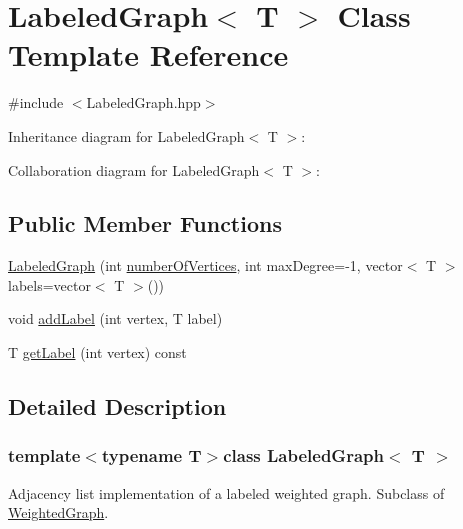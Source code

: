 \hypertarget{class_labeled_graph}{\section{Labeled\-Graph$<$ T $>$ Class Template Reference}
\label{class_labeled_graph}
}


{\ttfamily \#include $<$Labeled\-Graph.\-hpp$>$}



Inheritance diagram for Labeled\-Graph$<$ T $>$\-:


Collaboration diagram for Labeled\-Graph$<$ T $>$\-:
\subsection*{Public Member Functions}
\begin{DoxyCompactItemize}
\item 
\hyperlink{class_labeled_graph_aecb9afdb34ff295d07c17aee9271ec44}{Labeled\-Graph} (int \hyperlink{class_weighted_graph_ac6c8807a6c023525baec8525553c03eb}{number\-Of\-Vertices}, int max\-Degree=-\/1, vector$<$ T $>$ labels=vector$<$ T $>$())
\item 
void \hyperlink{class_labeled_graph_a822c3e3e1a2919cb1cec164c6f04be76}{add\-Label} (int vertex, T label)
\item 
T \hyperlink{class_labeled_graph_a4493f08c6e5e981a5b477a61246c26ff}{get\-Label} (int vertex) const 
\end{DoxyCompactItemize}


\subsection{Detailed Description}
\subsubsection*{template$<$typename T$>$class Labeled\-Graph$<$ T $>$}

Adjacency list implementation of a labeled weighted graph. Subclass of \hyperlink{class_weighted_graph}{Weighted\-Graph}. 

